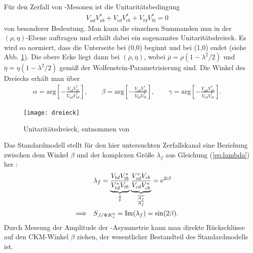 Für den Zerfall von \Bd-Mesonen ist die Unitaritätsbedingung
\begin{align}
V_{ud}V_{ub}^* + V_{cd}V_{cb}^* + V_{td}V_{tb}^* = 0
\end{align}
von besonderer Bedeutung. Man kann die einzelnen Summanden nun in der $(\rho,\eta)$-Ebene auftragen und erhält dabei ein sogenanntes Unitaritätsdreieck. Es wird so normiert, dass die Unterseite bei (0,0) beginnt und bei (1,0) endet (siehe Abb. \ref{fig:unitarity}). Die obere Ecke liegt dann bei $(\overline{\rho}, \overline{\eta})$, wobei $\overline{\rho} = \rho(1-\lambda^2/2)$ und $\overline{\eta} = \eta(1-\lambda^2/2)$ gemäß der Wolfenstein-Parametrisierung sind. Die Winkel des Dreiecks erhält man über
\begin{align}
\alpha = \text{arg}\left[-\frac{V_{td}V_{tb}^*}{V_{ud}V_{ub}^*}\right], \qquad
\beta = \text{arg}\left[-\frac{V_{cd}V_{cb}^*}{V_{td}V_{tb}^*}\right], \qquad
\gamma = \text{arg}\left[-\frac{V_{ud}V_{ub}^*}{V_{cd}V_{cb}^*}\right].
\end{align}
\begin{figure}[hptb]
\centering
\texttt{[image: dreieck]}
\caption{Unitaritätsdreieck, entnommen von \cite{dreieck}}
\label{fig:unitarity}
\end{figure}
Das Standardmodell stellt für den hier untersuchten Zerfallskanal eine Beziehung zwischen dem Winkel $\beta$ und der komplexen Größe $\lambda_f$ aus Gleichung (\ref{eq:lambda}) her \cite{nir,noguchi}:
\begin{align}
&\lambda_f = \underbrace{\frac{V_{td}V_{tb}^*}{V_{td}^*V_{tb}}}_{\frac{q}{p}} \underbrace{\frac{V_{cd}^*V_{cb}}{V_{cd}V_{cb}^*}}_{\frac{\overline{A_f}}{A_f}} = \mathrm{e}^{2\mathrm{i}\beta} \\
\Longrightarrow \quad &S_{J/\Psi K_s^0} = \mathrm{Im}(\lambda_f) = \sin(2\beta).
\end{align}
Durch Messung der Amplitude der \CP-Asymmetrie kann man direkte Rückschlüsse auf den CKM-Winkel $\beta$ ziehen, der wesentlicher Bestandteil des Standardmodells ist. \cite{nir}